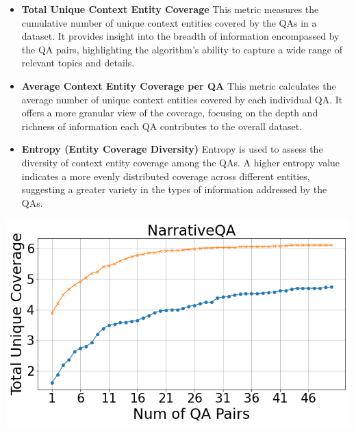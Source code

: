 \documentclass[11pt]{article}
\begin{document}
\begin{itemize}
    \item \textbf{Total Unique Context Entity Coverage} This metric measures the cumulative number of unique context entities covered by the QAs in a dataset. It provides insight into the breadth of information encompassed by the QA pairs, highlighting the algorithm's ability to capture a wide range of relevant topics and details.
\vspace{-2em}
    \item \textbf{Average Context Entity Coverage per QA} This metric calculates the average number of unique context entities covered by each individual QA. It offers a more granular view of the coverage, focusing on the depth and richness of information each QA contributes to the overall dataset.
\vspace{-0.7em}
    \item \textbf{Entropy (Entity Coverage Diversity)} Entropy is used to assess the diversity of context entity coverage among the QAs. A higher entropy value indicates a more evenly distributed coverage across different entities, suggesting a greater variety in the types of information addressed by the QAs.
\end{itemize}
\iffalse
\noindent
\begin{minipage}{0.33\textwidth}
    \includegraphics[width=\linewidth]{submissions/Tung2023/figs/NarrativeQA_Total Unique Coverage.png}
    \label{fig:narrativeqa-total-unique-coverage}
\end{minipage}%
\end{document}
